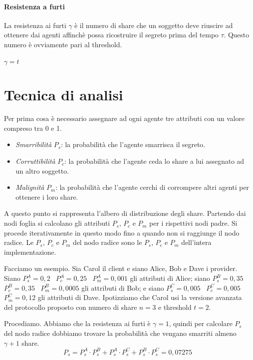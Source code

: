\paragraph{Resistenza a furti}
La resistenza ai furti $ \gamma $ è il numero di share che un soggetto deve riuscire
ad ottenere dai agenti affinchè possa
ricostruire il segreto prima del tempo $ \tau $.
Questo numero è ovviamente pari al threshold.
\begin{center}
	$ \gamma = t $
\end{center}


\section{Tecnica di analisi}
Per prima cosa è necessario assegnare ad ogni agente tre attributi con un valore
compreso tra 0 e 1.
\begin{itemize}
	\item \textit{Smarribilità} $ P_s $: la probabilità
	      che l'agente smarrisca il segreto.
	\item \textit{Corruttibilità} $ P_c $: la probabilità che l'agente ceda
	      lo share a lui assegnato ad un altro soggetto.
	\item \textit{Malignità} $ P_m $: la probabilità che l'agente cerchi di
	      corrompere altri agenti per ottenere i loro share.
\end{itemize}

A questo punto si rappresenta l'albero di distribuzione degli share.
Partendo dai nodi foglia si calcolano gli attributi $ P_s $, $ P_c $ e $ P_m $
per i rispettivi nodi padre. Si procede iterativamente in questo modo
fino a quando non si raggiunge il nodo radice. Le $ P_s $, $ P_c $ e $ P_m $
del nodo radice sono le $ P_s $, $ P_c $ e $ P_m $ dell'intera implementazione.

Facciamo un esempio. Sia Carol il client e siano Alice, Bob e Dave i provider.
Siano
$ P_s^A = 0,2 $ \,
$ P_c^A = 0,25 $ \,
$ P_m^A = 0,001 $
gli attributi di Alice;
siano
$ P_s^B = 0,35 $ \,
$ P_c^B = 0,35 $ \,
$ P_m^B = 0,0005 $
gli attributi di Bob;
e siano
$ P_s^C = 0,005 $ \,
$ P_c^C = 0,005 $ \,
$ P_m^C = 0,12 $
gli attributi di Dave.
Ipotizziamo che Carol usi la versione avanzata del protocollo
proposto con numero di share $ n = 3 $ e threshold $ t = 2 $.

Procediamo. Abbiamo che la resistenza ai furti è $ \gamma = 1 $, quindi per calcolare $ P_s $ del nodo
radice dobbiamo trovare la probabilità che vengano smarriti almeno $ \gamma + 1 $ share.
$$ P_s = P_s^A \cdot P_s^B + P_s^A \cdot P_s^C + P_s^B \cdot P_s^C = 0,07275 $$

